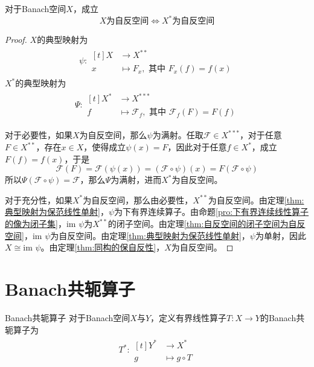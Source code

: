\documentclass[lang = cn, scheme = chinese, thmcnt = section]{elegantbook}
\newcommand{\im}{\text{im }}           %
\begin{document}
\begin{theorem}
	对于Banach空间$X$，成立
	$$
	X\text{为自反空间}\iff X^*\text{为自反空间}
	$$
\end{theorem}

\begin{proof}
	$X$的典型映射为
	\begin{align*}
		\psi:\begin{aligned}[t]
			X&\longrightarrow X^{**}\\
			x&\longmapsto F_x,\text{ 其中 }F_x(f)=f(x)
		\end{aligned}
	\end{align*}
	$X^{*}$的典型映射为
	\begin{align*}
		\Psi:\begin{aligned}[t]
			X^{*}&\longrightarrow X^{***}\\
			f&\longmapsto \mathscr{F}_f,\text{ 其中 }\mathscr{F}_f(F)=F(f)
		\end{aligned}
	\end{align*}
	
	对于必要性，如果$X$为自反空间，那么$\psi$为满射。任取$\mathscr{F}\in X^{***}$，对于任意$F\in X^{**}$，存在$x\in X$，使得成立$\psi(x)=F$，因此对于任意$f\in X^*$，成立$F(f)=f(x)$，于是
	$$
	\mathscr{F}(F)
	=\mathscr{F}(\psi(x))
	=(\mathscr{F}\circ\psi)(x)
	=F(\mathscr{F}\circ\psi)
	$$
	所以$\Psi(\mathscr{F}\circ\psi)=\mathscr{F}$，那么$\Psi$为满射，进而$X^*$为自反空间。
	
	对于充分性，如果$X^*$为自反空间，那么由必要性，$X^{**}$为自反空间。由定理\ref{thm:典型映射为保范线性单射}，$\psi$为下有界连续算子。由命题\ref{pro:下有界连续线性算子的像为闭子集}，$\im \psi$为$X^{**}$的闭子空间。由定理\ref{thm:自反空间的闭子空间为自反空间}，$\im\psi$为自反空间。由定理\ref{thm:典型映射为保范线性单射}，$\psi$为单射，因此$X\cong\im\psi$。由定理\ref{thm:同构的保自反性}，$X$为自反空间。
\end{proof}

\section{Banach共轭算子}

\begin{definition}{Banach共轭算子}
	对于Banach空间$X$与$Y$，定义有界线性算子$T:X\to Y$的Banach共轭算子为
	\begin{align*}
		T^*:\begin{aligned}[t]
			Y^*&\longrightarrow X^*\\
			g&\longmapsto g\circ T
		\end{aligned}
	\end{align*}
\end{definition}
\end{document}
